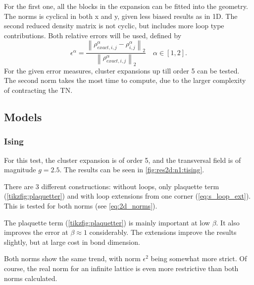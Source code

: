 For the first one, all the blocks in the expansion can be fitted into the geometry. The norms is cyclical in both x and y, given less biased results as in 1D. The second reduced density matrix is not cyclic, but includes more loop type contributions. Both relative errors will be used, defined by
\begin{equation}\label{eq:2d_norms}
    \epsilon^{\alpha} = \frac{  {  \left \|  \rho^{\alpha}_{exact,  i,j}- \rho^{\alpha}_{ i,j}  \right \|} _{2}  }{ {  \left\|  \rho^{\alpha}_{exact,  i,j} \right \|}_2} \quad \alpha \in [1,2] .
\end{equation}
For the given error measures, cluster expansions up till order 5 can be tested. The second norm takes the most time to compute, due to the larger complexity of contracting the \Gls{TN}.

\subsection{Models}

\subsubsection{Ising}

For this test, the cluster expansion is of order 5, and the transversal field is of magnitude $g=2.5$. The results can be seen in \cref{fig:res2d:n1:tising}.

There are 3 different constructions: without loops, only plaquette term (\cref{tikzfig:plaquetter}) and with loop extensions from one corner (\cref{eq:s_loop_ext}). This is tested for both norms (see \cref{eq:2d_norms}).

The plaquette term (\cref{tikzfig:plaquetter}) is mainly important at low $\beta$. It also improves the error at $\beta \approx 1$ considerably. The extensions improve the results slightly, but at large cost in bond dimension.

Both norms show the same trend, with norm $\epsilon^2$ being somewhat more strict. Of course, the real norm for an infinite lattice is even more restrictive than both norms calculated.

